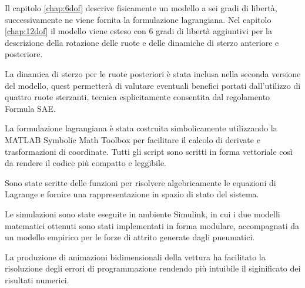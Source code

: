 Il capitolo \ref{chap:6dof} descrive fisicamente un modello a sei gradi di libertà, successivamente ne viene fornita la formulazione lagrangiana. Nel capitolo \ref{chap:12dof} il modello viene esteso con 6 gradi di libertà aggiuntivi per la descrizione della rotazione delle ruote e delle dinamiche di sterzo anteriore e posteriore.

La dinamica di sterzo per le ruote posteriori è stata inclusa nella seconda versione del modello, quest permetterà di valutare eventuali benefici portati dall'utilizzo di quattro ruote sterzanti, tecnica esplicitamente consentita dal regolamento Formula SAE.

La formulazione lagrangiana è stata costruita simbolicamente utilizzando la  MATLAB Symbolic Math Toolbox per facilitare il calcolo di derivate e trasformazioni di coordinate. Tutti gli script sono scritti in forma vettoriale così da rendere il codice più compatto e leggibile.

Sono state scritte delle funzioni per risolvere algebricamente le equazioni di Lagrange e fornire una rappresentazione in spazio di stato del sistema.

Le simulazioni sono state eseguite in ambiente Simulink, in cui i due modelli matematici ottenuti sono stati implementati in forma modulare, accompagnati da un modello empirico per le forze di attrito generate dagli pneumatici.

La produzione di animazioni bidimensionali della vettura ha facilitato la risoluzione degli errori di programmazione rendendo più intuibile il siginificato dei risultati numerici.
